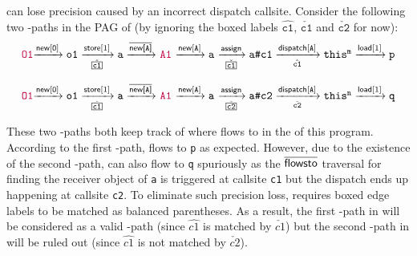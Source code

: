\LFC can lose precision caused by an incorrect  dispatch callsite. Consider the following two \LFC-paths in the PAG of  (by ignoring  the boxed labels $\hat{\boxed{\texttt{c1}}}$, $\check{\boxed{\texttt{c1}}}$ and $\check{\boxed{\texttt{c2}}}$ for now):
\begin{equation} 
\label{eq:ex2-inv-c1-site}
  \centering
\begin{tabular}{l} 
\commentfont{O1}$\xrightarrow{\new[\texttt{O}]} \texttt{o1} 
\xrightarrow[\hat{\boxed{\texttt{c1}}}]{\store[1]} \texttt{a} 
\xrightarrow{\inewfield{\texttt{A}}}
$
\commentfont{A1}
$ \xrightarrow{\new[\texttt{A}]} \texttt{a}$
$\xrightarrow[\check{\boxed{\texttt{c1}}}]{\assign} \texttt{a\#c1}
\xrightarrow[\hat{\texttt{c1}}]{\indispatch[\texttt{A}]} \texttt{this}^{\texttt{m}} 
\xrightarrow{\load[1]} \texttt{p}
$
\end{tabular}
\end{equation}

\vspace*{-1ex}

\begin{equation} 
\label{eq:ex2-inv-c2-site}
  \centering
\begin{tabular}{l} 
\commentfont{O1}$\xrightarrow{\new[\texttt{O}]} \texttt{o1} 
\xrightarrow[\hat{\boxed{\texttt{c1}}}]{\store[1]} \texttt{a} 
\xrightarrow{\inewfield{\texttt{A}}}
$
\commentfont{A1}
$ \xrightarrow{\new[\texttt{A}]} \texttt{a}$
$\xrightarrow[\check{\boxed{\texttt{c2}}}]{\assign} \texttt{a\#c2}
\xrightarrow[\hat{\texttt{c2}}]{\indispatch[\texttt{A}]} \texttt{this}^{\texttt{n}} 
\xrightarrow{\load[1]} \texttt{q}
$
\end{tabular}
\end{equation}

These two \LFC-paths both keep track of where   flows to in the
\pag of this program.
According to the first \LFC-path,  flows to \texttt{p} as 
expected. However, due to the existence of the second \LFC-path, 
 can also flow to \texttt{q} spuriously as the $\overline{\textsf{flowsto}}$ traversal for finding the receiver object of \texttt{a} is triggered at callsite \texttt{c1} but the dispatch ends up happening at  callsite \texttt{c2}. To eliminate such precision loss, \LR requires  boxed edge labels to be matched as balanced parentheses. As a result,  the first \LFC-path in  will be considered
as a valid \LFCR-path (since $\hat{\boxed{c1}}$ is matched by $\check{\boxed{c1}}$) but  the second \LFC-path in  will be ruled out (since $\hat{\boxed{c1}}$ is not matched by $\check{\boxed{c2}}$). 

